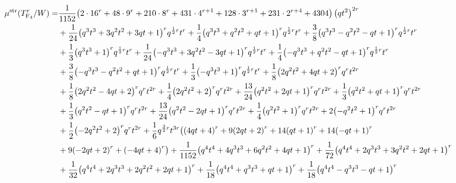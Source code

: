 \documentclass[11pt,english]{amsart}
\numberwithin{equation}{section}
\numberwithin{figure}{section}
\theoremstyle{plain}
\theoremstyle{plain}
\theoremstyle{definition}
\theoremstyle{remark}
\newcommand{\F}{\operatorname{F}}
\newcommand{\str}{\textup{str}}
\begin{document}
{\tiny
\begin{align*}
{\normalsize \mu^{\str}(T_{\F_4}^r/W)} =& \frac{1}{1152}  {\left(2 \cdot 16^{r} + 48 \cdot 9^{r} + 210 \cdot 8^{r} + 431 \cdot 4^{r + 1} + 128 \cdot 3^{r + 1} + 231 \cdot 2^{r + 4} + 4304\right)} \left(q t^{2}\right)^{2  r} \\
& + \frac{1}{24}  {\left(q^{3} t^{3} + 3  q^{2} t^{2} + 3  q t + 1\right)}^{r} q^{\frac{1}{2}  r} t^{r} + \frac{1}{4}  {\left(q^{3} t^{3} + q^{2} t^{2} + q t + 1\right)}^{r} q^{\frac{1}{2}  r} t^{r} + \frac{3}{8}  {\left(q^{3} t^{3} - q^{2} t^{2} - q t + 1\right)}^{r} q^{\frac{1}{2}  r} t^{r} \\
& + \frac{1}{3}  {\left(q^{3} t^{3} + 1\right)}^{r} q^{\frac{1}{2}  r} t^{r} + \frac{1}{24}  {\left(-q^{3} t^{3} + 3  q^{2} t^{2} - 3  q t + 1\right)}^{r} q^{\frac{1}{2}  r} t^{r} + \frac{1}{4}  {\left(-q^{3} t^{3} + q^{2} t^{2} - q t + 1\right)}^{r} q^{\frac{1}{2}  r} t^{r} \\
& + \frac{3}{8}  {\left(-q^{3} t^{3} - q^{2} t^{2} + q t + 1\right)}^{r} q^{\frac{1}{2}  r} t^{r} + \frac{1}{3}  {\left(-q^{3} t^{3} + 1\right)}^{r} q^{\frac{1}{2}  r} t^{r} + \frac{1}{8}  {\left(2  q^{2} t^{2} + 4  q t + 2\right)}^{r} q^{ r} t^{2r}\\
& + \frac{1}{8}  {\left(2  q^{2} t^{2} - 4  q t + 2\right)}^{r} q^{ r} t^{2r}+ \frac{1}{4}  {\left(2  q^{2} t^{2} + 2\right)}^{r} q^{ r} t^{2r}+ \frac{13}{24}  {\left(q^{2} t^{2} + 2  q t + 1\right)}^{r} q^{ r} t^{2r} + \frac{1}{3}  {\left(q^{2} t^{2} + q t + 1\right)}^{r} q^{ r} t^{2r}\\
& + \frac{1}{3}  {\left(q^{2} t^{2} - q t + 1\right)}^{r} q^{ r} t^{2r}+ \frac{13}{24}  {\left(q^{2} t^{2} - 2  q t + 1\right)}^{r} q^{ r} t^{2r}+ \frac{1}{4}  {\left(q^{2} t^{2} + 1\right)}^{r} q^{ r} t^{2r}+ 2  {\left(-q^{2} t^{2} + 1\right)}^{r} q^{ r} t^{2r}\\
& + \frac{1}{2}  {\left(-2  q^{2} t^{2} + 2\right)}^{r} q^{ r} t^{2r}+ \frac{1}{6}  q^{\frac{3}{2}  r} t^{3r} \big({\left(4  q t + 4\right)}^{r} + 9  {\left(2  q t + 2\right)}^{r} + 14  {\left(q t + 1\right)}^{r} + 14  {\left(-q t + 1\right)}^{r} \\
& + 9  {\left(-2  q t + 2\right)}^{r} + {\left(-4  q t + 4\right)}^{r}\big) + \frac{1}{1152}  {\left(q^{4} t^{4} + 4  q^{3} t^{3} + 6  q^{2} t^{2} + 4  q t + 1\right)}^{r} + \frac{1}{72}  {\left(q^{4} t^{4} + 2  q^{3} t^{3} + 3  q^{2} t^{2} + 2  q t + 1\right)}^{r} \\
& + \frac{1}{32}  {\left(q^{4} t^{4} + 2  q^{3} t^{3} + 2  q^{2} t^{2} + 2  q t + 1\right)}^{r} + \frac{1}{18}  {\left(q^{4} t^{4} + q^{3} t^{3} + q t + 1\right)}^{r} + \frac{1}{18}  {\left(q^{4} t^{4} - q^{3} t^{3} - q t + 1\right)}^{r} \\

\end{align*}}
\end{document}
